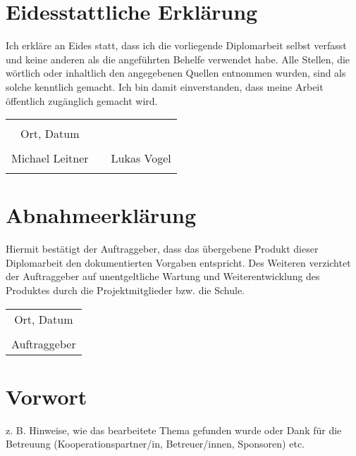 

\chapter*{Eidesstattliche Erklärung}
Ich erkläre an Eides statt, dass ich die vorliegende Diplomarbeit selbst verfasst und keine anderen als die angeführten Behelfe verwendet habe. Alle Stellen, die wörtlich oder inhaltlich den angegebenen Quellen entnommen wurden, sind als solche kenntlich gemacht.
Ich bin damit einverstanden, dass meine Arbeit öffentlich zugänglich gemacht wird.

\vspace{1cm}
\begin{tabular}{c c c}
	& \hspace{4cm} & \\\cline{1-1}
	Ort, Datum & & \\
	\vspace{2cm}
	& & \\\cline{1-1}\cline{3-3}
	Michael Leitner & & Lukas Vogel \\ 
	\vspace{2cm}

\end{tabular}

\chapter*{Abnahmeerklärung}
Hiermit bestätigt der Auftraggeber, dass das übergebene Produkt dieser Diplomarbeit den dokumentierten Vorgaben entspricht. Des Weiteren verzichtet der Auftraggeber auf unentgeltliche Wartung und Weiterentwicklung des Produktes durch die Projektmitglieder bzw. die Schule.

\vspace{1cm}
\begin{tabular}{c}
	\\\cline{1-1}
	Ort, Datum\\
	\vspace{2cm}
	\\\cline{1-1}
	Auftraggeber
\end{tabular}	

\chapter*{Vorwort}
z. B. Hinweise, wie das bearbeitete Thema gefunden wurde oder Dank für die Betreuung (Kooperationspartner/in, Betreuer/innen, Sponsoren) etc.

